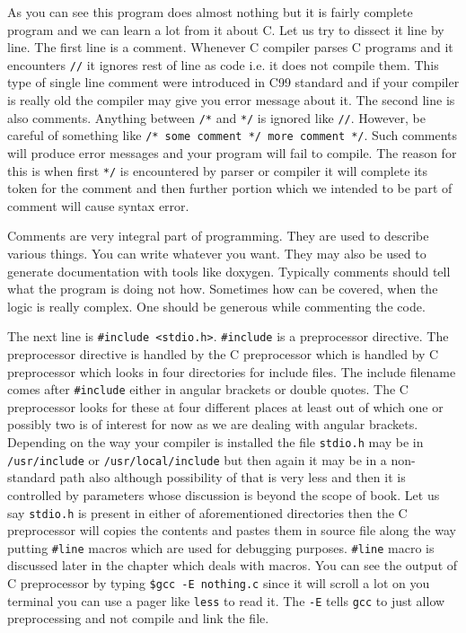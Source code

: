 As you can see this program does almost nothing but it is fairly complete 
program and we can learn a lot from it about C. Let us try to dissect it line
by line. The first line is a comment. 
Whenever C compiler parses C programs and it encounters \texttt{//} it ignores 
rest of line as code i.e. it does not compile them. This type of single line 
comment were introduced in C99 standard and if your compiler is really old the 
compiler may give you error message about it. The second line is
also comments. Anything between \texttt{/*} and \texttt{*/} is ignored like 
\texttt{//}. However, be careful of something like \texttt{/* some comment */
  more comment */}. Such comments will produce error messages and your program
will fail to compile. The reason for this is when first \texttt{*/} is
encountered by parser or compiler it will complete its token for the comment
and then further portion which we intended to be part of comment will cause
syntax error. 

Comments are very integral part of programming. They are used to describe 
various things. You can write whatever you want. They may also be used to 
generate documentation with tools like doxygen. Typically comments should tell
what the program is doing not how. Sometimes how can be covered, when the logic
is really complex. One should be generous while commenting the code.

The next line is \texttt{\#include <stdio.h>}. \texttt{\#include} is a
preprocessor directive. The preprocessor directive is handled by the C
preprocessor which is handled by C preprocessor which looks in four directories
for include files. The include filename comes after \texttt{\#include} either in
angular brackets or double quotes. The C preprocessor looks for these at four
different places at least out of which one or possibly two is of interest for
now as we are dealing with angular brackets. Depending on the way your compiler
is installed the file \texttt{stdio.h} may be in \texttt{/usr/include} or
\texttt{/usr/local/include} but then again it may be in a non-standard path
also although possibility of that is very less and then it is controlled by
parameters whose discussion is beyond the scope of book. Let us say
\texttt{stdio.h} is present in either of aforementioned directories then the C
preprocessor will copies the contents and pastes them in source file along the
way putting \texttt{\#line} macros which are used for debugging
purposes. \texttt{\#line} macro is discussed later in the chapter which deals
with macros. You can see the output of C preprocessor by typing \texttt{\$gcc
  -E nothing.c} since it will scroll a lot on you terminal you can use a pager
like \texttt{less} to read it. The \texttt{-E} tells \texttt{gcc} to just allow
preprocessing and not compile and link the file.

